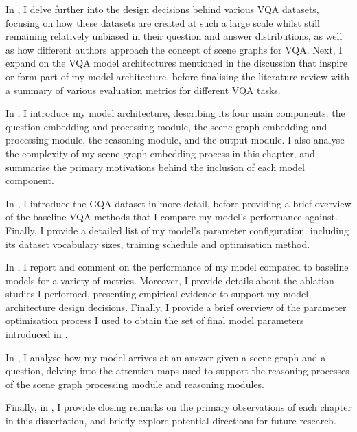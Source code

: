 In \chapterautorefname{ \ref{chapter:literature}}, I delve further into the design decisions behind various VQA datasets, focusing on how these datasets are created at such a large scale whilst still remaining relatively unbiased in their question and answer distributions, as well as how different authors approach the concept of scene graphs for VQA. Next, I expand on the VQA model architectures mentioned in the discussion that inspire or form part of my model architecture, before finalising the literature review with a summary of various evaluation metrics for different VQA tasks.

In \chapterautorefname{ \ref{chapter:methodology}}, I introduce my model architecture, describing its four main components: the question embedding and processing module, the scene graph embedding and processing module, the reasoning module, and the output module. I also analyse the complexity of my scene graph embedding process in this chapter, and summarise the primary motivations behind the inclusion of each model component.

In \chapterautorefname{ \ref{chapter:evaluation}}, I introduce the GQA dataset in more detail, before providing a brief overview of the baseline VQA methods that I compare my model's performance against. Finally, I provide a detailed list of my model's parameter configuration, including its dataset vocabulary sizes, training schedule and optimisation method.

In \chapterautorefname{ \ref{chapter:results}}, I report and comment on the performance of my model compared to baseline models for a variety of metrics. Moreover, I provide details about the ablation studies I performed, presenting empirical evidence to support my model architecture design decisions. Finally, I provide a brief overview of the parameter optimisation process I used to obtain the set of final model parameters introduced in \chapterautorefname{ \ref{chapter:evaluation}}.

In \chapterautorefname{ \ref{chapter:discussion}}, I analyse how my model arrives at an answer given a scene graph and a question, delving into the attention maps used to support the reasoning processes of the scene graph processing module and reasoning modules.

Finally, in \chapterautorefname{ \ref{chapter:conclusion}}, I provide closing remarks on the primary observations of each chapter in this dissertation, and briefly explore potential directions for future research.
